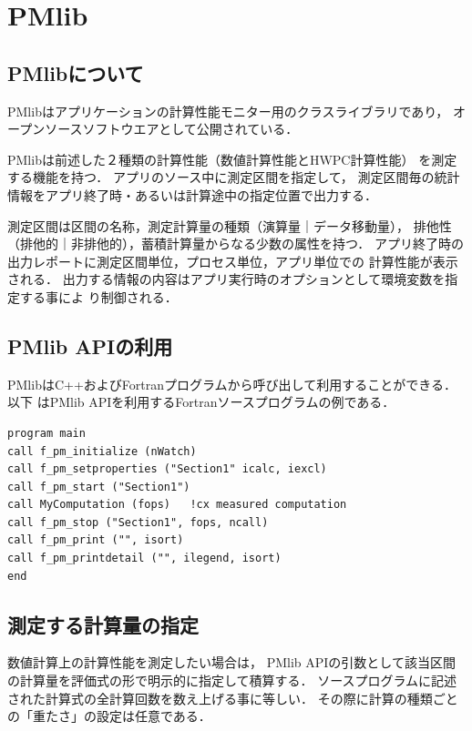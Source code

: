 \documentclass[submit,techrep,noauthor]{ipsj}
\begin{document}
\section{PMlib}

\subsection {PMlibについて}

PMlibはアプリケーションの計算性能モニター用のクラスライブラリであり，
オープンソースソフトウエアとして公開されている．
\cite{PMlib2:webpage} \par
PMlibは前述した２種類の計算性能（数値計算性能とHWPC計算性能）
を測定する機能を持つ．
アプリのソース中に測定区間を指定して，
測定区間毎の統計情報をアプリ終了時・あるいは計算途中の指定位置で出力する．

測定区間は区間の名称，測定計算量の種類（演算量｜データ移動量），
排他性（排他的｜非排他的），蓄積計算量からなる少数の属性を持つ．
アプリ終了時の出力レポートに測定区間単位，プロセス単位，アプリ単位での
計算性能が表示される．
出力する情報の内容はアプリ実行時のオプションとして環境変数を指定する事によ
り制御される．


\subsection {PMlib APIの利用}
PMlibはC++およびFortranプログラムから呼び出して利用することができる．
以下
はPMlib APIを利用するFortranソースプログラムの例である．
\begin{lstlisting}
program main
call f_pm_initialize (nWatch)
call f_pm_setproperties ("Section1" icalc, iexcl)
call f_pm_start ("Section1")
call MyComputation (fops)	!cx measured computation
call f_pm_stop ("Section1", fops, ncall)
call f_pm_print ("", isort)
call f_pm_printdetail ("", ilegend, isort)
end
\end{lstlisting}


\subsection {測定する計算量の指定}
数値計算上の計算性能を測定したい場合は，
PMlib APIの引数として該当区間の計算量を評価式の形で明示的に指定して積算する．
ソースプログラムに記述された計算式の全計算回数を数え上げる事に等しい．
その際に計算の種類ごとの「重たさ」の設定は任意である．
\end{document}
